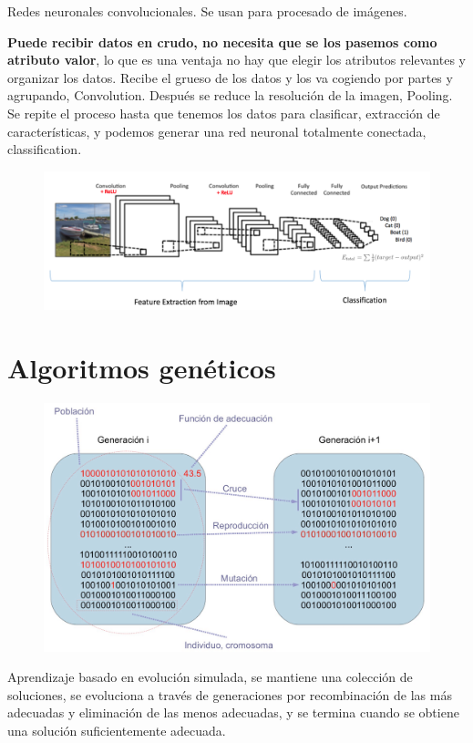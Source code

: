 \documentclass[12pt]{report} %
\begin{document}
Redes neuronales convolucionales. Se usan para procesado de imágenes.

\textbf{Puede recibir datos en crudo, no necesita que se los pasemos
como atributo valor}, lo que es una ventaja no hay que elegir los atributos
relevantes y organizar los datos. Recibe el grueso de los datos y los
va cogiendo por partes y agrupando, Convolution. Después se reduce la
resolución de la imagen, Pooling. Se repite el proceso hasta que tenemos
los datos para clasificar, extracción de características, y podemos
generar una red neuronal totalmente conectada, classification.

\begin{figure}[H]
	{\includegraphics[scale=.3]{image-20210312111406573.png}}
\end{figure}

\section{Algoritmos genéticos}
\begin{figure}[H]
	{\includegraphics[scale=.4]{2021-03-19 11_26_59-otras-tecnicas.pdf - Foxit Reader.png}}
\end{figure}
Aprendizaje basado en evolución simulada, se mantiene una colección de soluciones, se evoluciona a través de generaciones por recombinación de las más adecuadas y eliminación de las menos adecuadas, y se termina cuando se obtiene una solución suficientemente adecuada.
\end{document}
